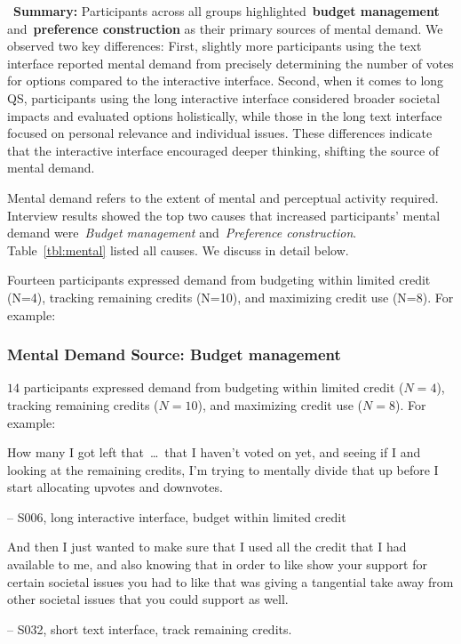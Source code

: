 \vspace{5pt}
\begin{tldrbox}
    \faInfoCircle~\xspace\textbf{Summary:} Participants across all groups highlighted~\textbf{budget management} and~\textbf{preference construction} as their primary sources of mental demand. We observed two key differences: First, slightly more participants using the text interface reported mental demand from precisely determining the number of votes for options compared to the interactive interface. Second, when it comes to long QS, participants using the long interactive interface considered broader societal impacts and evaluated options holistically, while those in the long text interface focused on personal relevance and individual issues. These differences indicate that the interactive interface encouraged deeper thinking, shifting the source of mental demand. %
\end{tldrbox}

Mental demand refers to the extent of mental and perceptual activity required. Interview results showed the top two causes that increased participants' mental demand were~\textit{Budget management} and~\textit{Preference construction}. Table~\ref{tbl:mental} listed all causes. We discuss in detail below.

Fourteen participants expressed demand from budgeting within limited credit (N=4), tracking remaining credits (N=10), and maximizing credit use (N=8). For example:

\subsubsection{Mental Demand Source: Budget management} $14$ participants expressed demand from budgeting within limited credit ($N=4$), tracking remaining credits ($N=10$), and maximizing credit use ($N=8$). For example:

\begin{displayquote}
How many I got left that~\ldots\ that I haven't voted on yet, and seeing if I and looking at the remaining credits, I'm trying to mentally divide that up before I start allocating upvotes and downvotes.

\small{\noindent \hfill -- S006, long interactive interface, budget within limited credit}
\end{displayquote}

\begin{displayquote}
And then I just wanted to make sure that I used all the credit that I had available to me, and also knowing that in order to like show your support for certain societal issues you had to like that was giving a tangential take away from other societal issues that you could support as well.
    
\noindent \hfill -- S032, short text interface, track remaining credits.
\end{displayquote}

